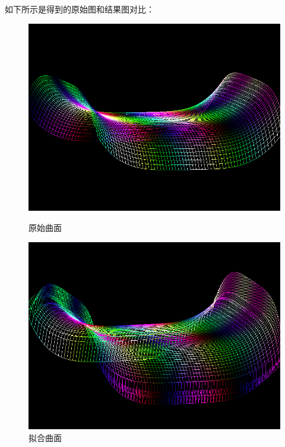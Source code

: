 \documentclass[10pt]{article}
\begin{document}
如下所示是得到的原始图和结果图对比：
\begin{figure}[H]
\begin{center}
\begin{minipage}[t]{0.45\linewidth}
\centering
\includegraphics[scale=0.35]{saddle_raw.png}
\caption{原始曲面}
\end{minipage}%
\begin{minipage}[t]{0.45\linewidth}
\centering
\includegraphics[scale=0.35]{saddle_out.png}
\caption{拟合曲面}
\end{minipage}
\end{center}
\end{figure}
\end{document}
